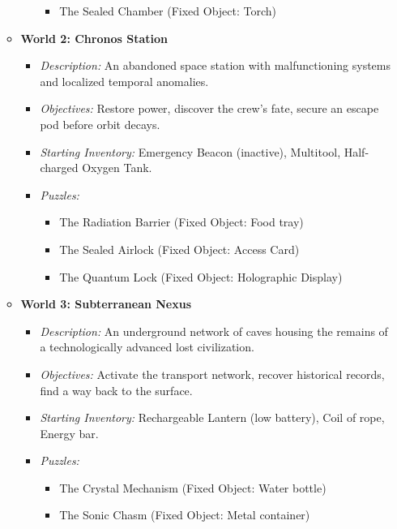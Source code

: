 \documentclass{article}
\begin{document}
\begin{itemize}
\begin{itemize}
\begin{itemize}
\begin{itemize}
                            \item The Sealed Chamber (Fixed Object: Torch)
                        \end{itemize}
                \end{itemize}
            \item \textbf{World 2: Chronos Station}
                \begin{itemize}
                    \item \textit{Description:} An abandoned space station with malfunctioning systems and localized temporal anomalies.
                    \item \textit{Objectives:} Restore power, discover the crew's fate, secure an escape pod before orbit decays.
                    \item \textit{Starting Inventory:} Emergency Beacon (inactive), Multitool, Half-charged Oxygen Tank.
                    \item \textit{Puzzles:}
                        \begin{itemize}
                            \item The Radiation Barrier (Fixed Object: Food tray)
                            \item The Sealed Airlock (Fixed Object: Access Card)
                            \item The Quantum Lock (Fixed Object: Holographic Display)
                        \end{itemize}
                \end{itemize}
            \item \textbf{World 3: Subterranean Nexus}
                \begin{itemize}
                    \item \textit{Description:} An underground network of caves housing the remains of a technologically advanced lost civilization.
                    \item \textit{Objectives:} Activate the transport network, recover historical records, find a way back to the surface.
                    \item \textit{Starting Inventory:} Rechargeable Lantern (low battery), Coil of rope, Energy bar.
                    \item \textit{Puzzles:}
                        \begin{itemize}
                            \item The Crystal Mechanism (Fixed Object: Water bottle)
                            \item The Sonic Chasm (Fixed Object: Metal container)

\end{itemize}
\end{itemize}
\end{itemize}
\end{itemize}
\end{document}
